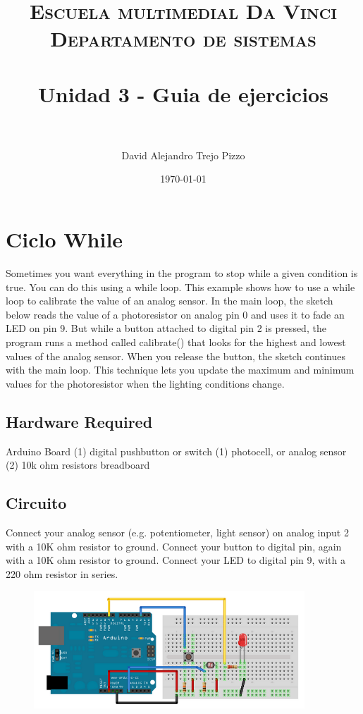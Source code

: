 \documentclass[paper=a4, fontsize=11pt]{scrartcl}
\title{	
\normalfont \normalsize 
\textsc{Escuela multimedial Da Vinci} \\ [25pt]
\textsc{Departamento de sistemas} \\ [25pt]
\horrule{0.5pt} \\[0.4cm]
\huge Unidad 3 - Guia de ejercicios\\
\horrule{2pt} \\[0.5cm]
}
\author{David Alejandro Trejo Pizzo}
\date{\normalsize\today}
\numberwithin{equation}{section}
\numberwithin{figure}{section}
\numberwithin{table}{section}
\begin{document}
\maketitle


\section{Ciclo While}

\lipsum[2] %

Sometimes you want everything in the program to stop while a given condition is true. You can do this using a while loop. This example shows how to use a while loop to calibrate the value of an analog sensor.
In the main loop, the sketch below reads the value of a photoresistor on analog pin 0 and uses it to fade an LED on pin 9. But while a button attached to digital pin 2 is pressed, the program runs a method called calibrate() that looks for the highest and lowest values of the analog sensor. When you release the button, the sketch continues with the main loop.
This technique lets you update the maximum and minimum values for the photoresistor when the lighting conditions change.

\subsection{Hardware Required}

Arduino Board
(1) digital pushbutton or switch
(1) photocell, or analog sensor
(2) 10k ohm resistors
breadboard

\subsection{Circuito}

Connect your analog sensor (e.g. potentiometer, light sensor) on analog input 2 with a 10K ohm resistor to ground. Connect your button to digital pin, again with a 10K ohm resistor to ground. Connect your LED to digital pin 9, with a 220 ohm resistor in series.

\begin{figure}[!h]
\centering
\includegraphics[width=4in]{circuito1}
\end{figure}
\end{document}
